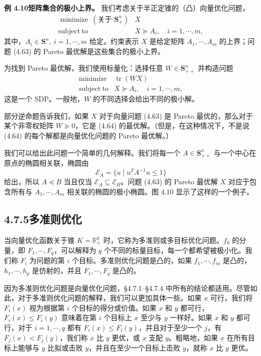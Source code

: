 \documentclass[UTF8, 12pt, fontset=fandol, oneside]{ctexart}
\begin{document}
\noindent\textbf{例 4.10\quad 矩阵集合的极小上界。}\quad
我们考虑关于半正定锥的（凸）向量优化问题，
\begin{equation}
\begin{array}{ll}
\mathop{\mathrm{minimize}}\ (\text{关于 }\mathbf{S}_+^n) & X\\
\mathrm{subject\ to} & X\succeq A_i,\quad i=1,\cdots,m,
\end{array}
\tag{4.63}
\end{equation}
其中，$A_i\in\mathbf{S}^n,\ i=1,\cdots,m$ 给定。约束表示 $X$ 是给定矩阵 $A_1,\cdots,A_m$ 的上界；问题 (4.63) 的 Pareto 最优解是这些集合的极小上界。

为找到 Pareto 最优解，我们使用标量化：选择任意 $W\in\mathbf{S}_{++}^n$ 并构造问题
\begin{equation}
\begin{array}{ll}
\mathop{\mathrm{minimize}} & \operatorname{tr}(WX)\\
\mathrm{subject\ to} & X\succeq A_i,\quad i=1,\cdots,m,
\end{array}
\tag{4.64}
\end{equation}
这是一个 SDP。一般地，$W$ 的不同选择会给出不同的极小解。

部分逆命题告诉我们，如果 $X$ 对于向量问题 (4.63) 是 Pareto 最优的，那么对于某个非零权矩阵 $W\succeq 0$，它是 (4.64) 的最优解。（但是，在这种情况下，不是说 (4.64) 的每个解都是向量优化问题的 Pareto 最优解。）

我们可以给出此问题一个简单的几何解释。我们将每一个 $A\in\mathbf{S}_{++}^n$ 与一个中心在原点的椭圆相关联，椭圆由
\[
\mathcal{E}_A=\{u\mid u^TA^{-1}u\leq 1\}
\]
给出，所以 $A\preceq B$ 当且仅当 $\mathcal{E}_A\subseteq\mathcal{E}_B$。问题 (4.63) 的 Pareto 最优解 $X$ 对应于包含所有与 $A_1,\cdots,A_m$ 相关联的椭圆的极小椭圆。图 4.10 显示了这样的一个例子。

\subsection*{4.7.5\quad 多准则优化}

当向量优化函数关于锥 $K=\mathbb{R}_+^q$ 时，它称为多准则或多目标优化问题。$f_0$ 的分量，即 $F_1,\cdots,F_q$，可以解释为 $q$ 个不同的标量目标，每一个都希望被极小化。我们称 $F_i$ 为问题的第 $i$ 个目标。多准则优化问题是凸的，如果 $f_1,\cdots,f_m$ 是凸的，$h_1,\cdots,h_p$ 是仿射的，并且 $F_1,\cdots,F_q$ 是凸的。

因为多准则优化问题是向量优化问题，\S 4.7.1--\S 4.7.4 中所有的结论都适用。尽管如此，对于多准则优化问题的解释，我们可以更加具体一些。如果 $x$ 可行，我们将 $F_i(x)$ 视为根据第 $i$ 个目标的得分或价值。如果 $x$ 和 $y$ 都可行，$F_i(x)\leq F_i(y)$ 意味着在第 $i$ 个目标上 $x$ 至少与 $y$ 一样好。如果 $x$ 和 $y$ 都可行，对于 $i=1,\cdots,q$ 都有 $F_i(x)\leq F_i(y)$，并且对于至少一个 $j$，有 $F_j(x)<F_j(y)$，我们称 $x$ 比 $y$ 更优，或 $x$ 支配 $y$。粗略地，如果 $x$ 在所有目标上能够与 $y$ 比拟或击败 $y$，并且在至少一个目标上击败 $y$，就称 $x$ 比 $y$ 更优。
\end{document}
